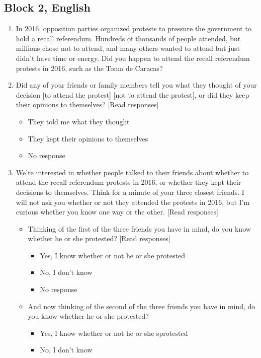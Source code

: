 \documentclass[12pt]{article}
\begin{document}
\subsection{Block 2, English}
\begin{enumerate}
\item In 2016, opposition parties organized protests to pressure the government to hold a recall referendum. Hundreds of thousands of people attended, but millions chose not to attend, and many others wanted to attend but just didn't have time or energy. Did you happen to attend the recall referendum protests in 2016, such as the Toma de Caracas?
\item Did any of your friends or family members tell you what they thought of your decision [to attend the protest] [not to attend the protest], or did they keep their opinions to themselves? [Read responses]
\begin{itemize}
\item They told me what they thought
\item They kept their opinions to themselves
\item No response
\end{itemize}
\item We're interested in whether people talked to their friends about whether to attend the recall referendum protests in 2016, or whether they kept their decisions to themselves. Think for a minute of your three closest friends. I will not ask you whether or not they attended the protests in 2016, but I'm curious whether you know one way or the other. [Read responses]
\begin{itemize}
\item Thinking of the first of the three friends you have in mind, do you know whether he or she protested? [Read responses]
\begin{itemize}
\item Yes, I know whether or not he or she protested
\item No, I don't know
\item No response
\end{itemize}
\end{itemize}
\begin{itemize}
\item And now thinking of the second of the three friends you have in mind, do you know whether he or she protested?
\begin{itemize}
\item Yes, I know whether or not he or she sprotested
\item No, I don't know

\end{itemize}
\end{itemize}
\end{enumerate}
\end{document}
